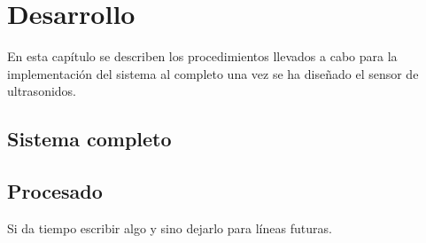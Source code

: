 \chapter{Desarrollo\label{sec:desarrollo}}

En esta capítulo se describen los procedimientos llevados a cabo para la implementación del sistema al completo una vez se ha diseñado el sensor de ultrasonidos.

\section{Sistema completo}



\section{Procesado}

Si da tiempo escribir algo y sino dejarlo para líneas futuras.